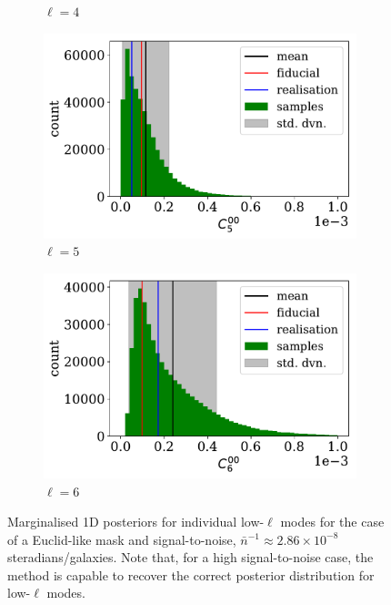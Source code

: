 \begin{figure}
\begin{subfigure}{.5\textwidth}
  \caption{$\ell = 4$}
\end{subfigure}
\begin{subfigure}{.5\textwidth}
  \centering
  \includegraphics[width=\textwidth]{BPL-FIGS/Euclid-LN-PNoi-N32-HDens_HISTOGRAM-ell-05.pdf}
  \caption{$\ell = 5$}
\end{subfigure}
\begin{center}
\begin{subfigure}{.5\textwidth}
  \centering
  \includegraphics[width=\textwidth]{BPL-FIGS/Euclid-LN-PNoi-N32-HDens_HISTOGRAM-ell-06.pdf}
  \caption{$\ell = 6$}
\end{subfigure}
\end{center}
\caption[Examples of marginalised 1D posteriors for individual low-$\ell$ modes for the case of a Euclid-like mask and signal-to-noise.]{Marginalised 1D posteriors for individual low-$\ell$ modes for the case of a Euclid-like mask and signal-to-noise, $\bar{n}^{-1}\approx 2.86\times 10^{-8}$ steradians/galaxies. Note that, for a high signal-to-noise case, the method is capable to recover the correct posterior distribution for low-$\ell$ modes.}
\label{fig:BPL:Euclid-Ells-HighSN-LowEll}
\end{figure}


